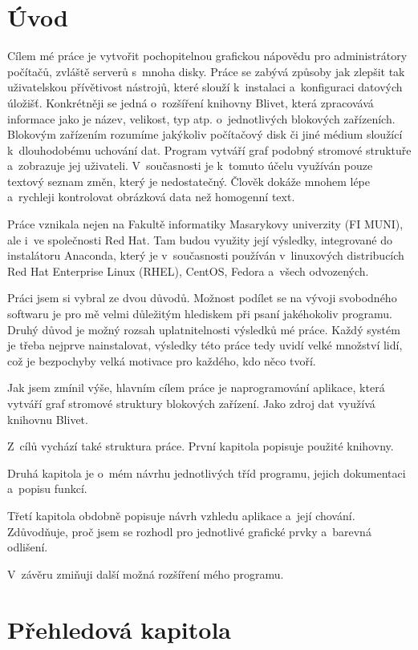 \documentclass[color,table,oneside,nolot,nolof]{fithesis}
\begin{document}
\chapter{Úvod}
	Cílem mé  práce je vytvořit pochopitelnou grafickou nápovědu pro administrátory počítačů, zvláště serverů s~mnoha disky. Práce se zabývá 
	způsoby jak zlepšit tak uživatelskou přívětivost nástrojů, které slouží k~instalaci a~konfiguraci datových úložišť.
	Konkrétněji se jedná o~rozšíření knihovny Blivet, která zpracovává informace jako je název, velikost, typ atp.
	o~jednotlivých blokových zařízeních. Blokovým zařízením rozumíme jakýkoliv počítačový disk či jiné médium sloužící k~dlouhodobému uchování dat.
	Program vytváří graf podobný stromové struktuře a~zobrazuje jej uživateli.  V~současnosti je k~tomuto účelu využíván pouze textový 
	seznam změn, který je nedostatečný. Člověk dokáže mnohem lépe a~rychleji kontrolovat obrázková data než homogenní text. 
	
	Práce vznikala nejen na Fakultě informatiky Masarykovy univerzity (FI MUNI), ale i~ve společnosti Red Hat. Tam budou využity její výsledky,
	integrované do instalátoru Anaconda, který je v~současnosti používán v~linuxových distribucích Red Hat Enterprise Linux (RHEL), CentOS, Fedora a~všech
	odvozených\cite{anaconda-rhel}.

	Práci jsem si vybral ze dvou důvodů.  Možnost podílet se na vývoji svobodného softwaru je pro mě velmi důležitým hlediskem 
	při psaní jakéhokoliv programu. Druhý důvod je možný rozsah uplatnitelnosti výsledků mé práce. Každý systém je třeba nejprve nainstalovat, výsledky
	této práce tedy uvidí velké množství lidí, což je bezpochyby velká motivace pro každého, kdo něco tvoří. 

	Jak jsem zmínil výše, hlavním cílem práce je naprogramování aplikace, která vytváří graf stromové struktury blokových zařízení. Jako zdroj dat
	využívá knihovnu Blivet.  

	Z~cílů vychází také struktura práce. První kapitola popisuje použité knihovny.  

	Druhá kapitola je o~mém návrhu jednotlivých tříd programu, jejich dokumentaci a~popisu funkcí. 

	Třetí kapitola obdobně popisuje návrh vzhledu aplikace a~její chování. Zdůvodňuje, proč jsem se rozhodl pro jednotlivé grafické prvky a~barevná odlišení.

	V~závěru zmiňuji další možná rozšíření mého programu. 

\chapter{Přehledová kapitola}
\end{document}
